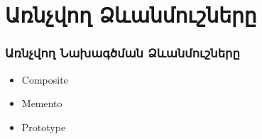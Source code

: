 \documentclass{beamer}
\begin{document}
\section{Առնչվող Ձևանմուշները}
\begin{frame}\frametitle{Առնչվող Նախագծման Ձևանմուշները}
\begin{itemize}
    \item Composite \vfill
    \item Memento \vfill
    \item Prototype
\end{itemize}
\end{frame}
\end{document}
